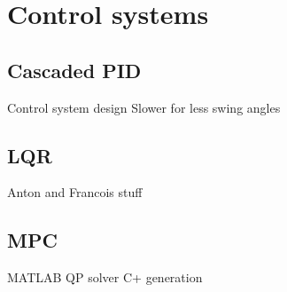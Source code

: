\graphicspath{{control_systems/fig/}}

\chapter{Control systems}
\label{chap:control_systems}

    \section{Cascaded \gls{PID}}

        Control system design
        Slower for less swing angles

    \section{\gls{LQR}}

        Anton and Francois stuff

    \section{\gls{MPC}}

        MATLAB
        QP solver
        C+ generation

